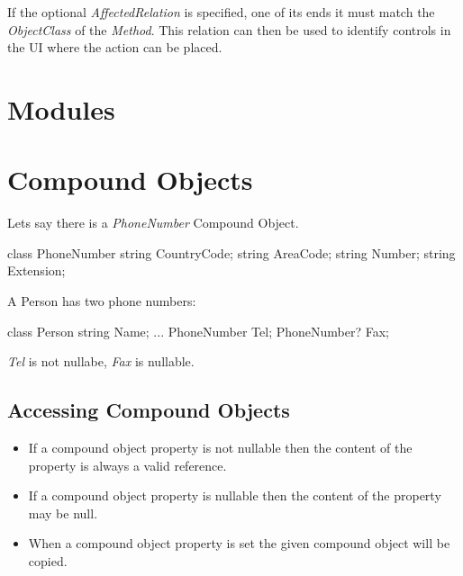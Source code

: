 If the optional \emph{AffectedRelation} is specified, one of its ends it
must match the \emph{ObjectClass} of the \emph{Method}. This relation
can then be used to identify controls in the UI where the action can be
placed.

\section{Modules}

\section{Compound Objects}
Lets say there is a \emph{PhoneNumber} Compound Object.
\begin{CS}
class PhoneNumber
{
	string CountryCode;
	string AreaCode;
	string Number;
	string Extension;
}
\end{CS}

A Person has two phone numbers:

\begin{CS}
class Person
{
	string Name;
	...
	PhoneNumber  Tel;
	PhoneNumber? Fax;
}
\end{CS}
\emph{Tel} is not nullabe, \emph{Fax} is nullable.

\subsection{Accessing Compound Objects}

\begin{itemize}
	\item{If a compound object property is not nullable then the content of the property is always a valid reference.}
	\item{If a compound object property is  nullable then the content of the property may be null.}
	\item{When a compound object property is set the given compound object will be copied.}
\end{itemize}

